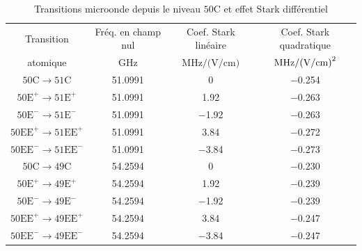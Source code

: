 		
%
\begin{table}[!h]
	\centering
	\caption[Transitions microonde depuis le niveau $\mathrm{50C}$ et effet Stark différentiel]{
	Transitions microonde depuis le niveau $\mathrm{50C}$ et effet Stark différentiel
	}
	\label{tab:Stark_49-50-51C}
	\begin{tabular}{cccc}
		\toprule\midrule
		Transition
		& Fréq. en champ nul
		& Coef. Stark linéaire
		& Coef. Stark quadratique
		\\
		atomique
		& $\si{\GHz}$
		& $\si{\MHz \per (\V \per\cm)}$
		& $\si{\MHz \per (\V \per\cm) \squared}$ \\
		\midrule
		$\mathrm{50C \rightarrow 51C}$
		& \SI{51.0991}{}
		& \SI{0}{}
		& \SI{-0.254}{} \\
		$\mathrm{50E^+ \rightarrow 51E^+}$
		& \SI{51.0991}{}
		& \SI[retain-explicit-plus]{+1.92}{}
		& \SI{-0.263}{} \\
		$\mathrm{50E^- \rightarrow 51E^-}$
		& \SI{51.0991}{}
		& \SI[retain-explicit-plus]{-1.92}{}
		& \SI{-0.263}{} \\
		$\mathrm{50EE^+ \rightarrow 51EE^+}$
		& \SI{51.0991}{}
		& \SI[retain-explicit-plus]{+3.84}{}
		& \SI{-0.272}{} \\
		$\mathrm{50EE^- \rightarrow 51EE^-}$
		& \SI{51.0991}{}
		& \SI[retain-explicit-plus]{-3.84}{}
		& \SI{-0.273}{} \\
		\midrule
		$\mathrm{50C \rightarrow 49C}$
		& \SI{54.2594}{}
		& \SI{0}{}
		& \SI{-0.230}{} \\
		$\mathrm{50E^+ \rightarrow 49E^+}$
		& \SI{54.2594}{}
		& \SI[retain-explicit-plus]{+1.92}{}
		& \SI{-0.239}{} \\
		$\mathrm{50E^- \rightarrow 49E^-}$
		& \SI{54.2594}{}
		& \SI[retain-explicit-plus]{-1.92}{}
		& \SI{-0.239}{} \\
		$\mathrm{50EE^+ \rightarrow 49EE^+}$
		& \SI{54.2594}{}
		& \SI[retain-explicit-plus]{+3.84}{}
		& \SI{-0.247}{} \\
		$\mathrm{50EE^- \rightarrow 49EE^-}$
		& \SI{54.2594}{}
		& \SI[retain-explicit-plus]{-3.84}{}
		& \SI{-0.247}{} \\
		\midrule
		\bottomrule
 	\end{tabular}
\end{table}
%

